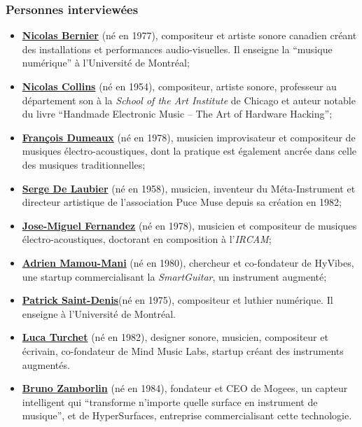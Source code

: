 \subsubsection*{Personnes interviewées}

\begin{itemize}[noitemsep]
\item \textbf{\hyperref[appendix:bernier]{Nicolas Bernier}} (né en 1977), compositeur et artiste sonore canadien créant des installations et performances audio-visuelles. Il enseigne la ``musique numérique'' à l'Université de Montréal;
\item \textbf{\hyperref[appendix:collins]{Nicolas Collins}} (né en 1954), compositeur, artiste sonore, professeur au département son à la \textit{School of the Art Institute} de Chicago et auteur notable du livre ``Handmade Electronic Music – The Art of Hardware Hacking''\cite{collins_handmade_2006};
\item \textbf{\hyperref[appendix:dumeaux]{François Dumeaux}} (né en 1978), musicien improvisateur  et compositeur de musiques électro-acoustiques, dont la pratique est également ancrée dans celle des musiques traditionnelles;
\item \textbf{\hyperref[appendix:delaubier]{Serge De Laubier}} (né en 1958), musicien, inventeur du Méta-Instrument et directeur artistique de l'association Puce Muse depuis sa création en 1982;
\item \textbf{\hyperref[appendix:fernandez]{Jose-Miguel Fernandez}} (né en 1978), musicien et compositeur de musiques électro-acoustiques, doctorant en composition à l'\textit{IRCAM};
\item \textbf{\hyperref[appendix:mamou-mani]{Adrien Mamou-Mani}} (né en 1980), chercheur et co-fondateur de HyVibes, une startup commercialisant la \textit{SmartGuitar}, un instrument augmenté;
\item \textbf{\hyperref[appendix:saint-denis]{Patrick Saint-Denis}}(né en 1975), compositeur et luthier numérique. Il enseigne à l'Université de Montréal.
\item \textbf{\hyperref[appendix:turchet]{Luca Turchet}} (né en 1982), designer sonore, musicien, compositeur et écrivain, co-fondateur de Mind Music Labs, startup créant des instruments augmentés.
\item \textbf{\hyperref[appendix:zamborlin]{Bruno Zamborlin}} (né en 1984), fondateur et CEO de Mogees, un capteur intelligent qui ``transforme n'importe quelle surface en instrument de musique'', et de HyperSurfaces, entreprise commercialisant cette technologie. 
\end{itemize}



